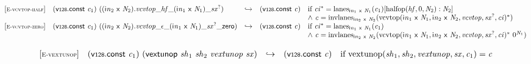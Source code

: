 $$
\begin{array}{@{}l@{}lcl@{}l@{}}
{[\textsc{\scriptsize E{-}vcvtop{-}half}]} \quad & (\mathsf{v{\scriptstyle128}}.\mathsf{const}~{\mathit{c}}_{{1}})~(({{\mathsf{i}}{{\mathit{n}}}}_{{2}}~\mathsf{x}~{\mathit{N}}_{{2}}) . {{{{{{{\mathit{vcvtop}}}{\mathsf{\_}}}{{\mathit{hf}}}}{\mathsf{\_}}}{({{\mathsf{i}}{{\mathit{n}}}}_{{1}}~\mathsf{x}~{\mathit{N}}_{{1}})}}{\mathsf{\_}}}{{{\mathit{sx}}^?}}) &\hookrightarrow& (\mathsf{v{\scriptstyle128}}.\mathsf{const}~{\mathit{c}}) &\quad
  \mbox{if}~{{\mathit{ci}}^\ast} = {{\mathrm{lanes}}}_{{{\mathsf{i}}{{\mathit{n}}}}_{{1}}~\mathsf{x}~{\mathit{N}}_{{1}}}({\mathit{c}}_{{1}})[{\mathrm{halfop}}({\mathit{hf}}, 0, {\mathit{N}}_{{2}}) : {\mathit{N}}_{{2}}] \\
 &&&&\quad {\land}~{\mathit{c}} = {{\mathrm{invlanes}}}_{{{\mathsf{i}}{{\mathit{n}}}}_{{2}}~\mathsf{x}~{\mathit{N}}_{{2}}}({{\mathrm{vcvtop}}({{\mathsf{i}}{{\mathit{n}}}}_{{1}}~\mathsf{x}~{\mathit{N}}_{{1}}, {{\mathsf{i}}{{\mathit{n}}}}_{{2}}~\mathsf{x}~{\mathit{N}}_{{2}}, {\mathit{vcvtop}}, {{\mathit{sx}}^?}, {\mathit{ci}})^\ast}) \\
{[\textsc{\scriptsize E{-}vcvtop{-}zero}]} \quad & (\mathsf{v{\scriptstyle128}}.\mathsf{const}~{\mathit{c}}_{{1}})~(({{\mathsf{i}}{{\mathit{n}}}}_{{2}}~\mathsf{x}~{\mathit{N}}_{{2}}) . {{{{{{{{{\mathit{vcvtop}}}{\mathsf{\_}}}{\epsilon}}{\mathsf{\_}}}{({{\mathsf{i}}{{\mathit{n}}}}_{{1}}~\mathsf{x}~{\mathit{N}}_{{1}})}}{\mathsf{\_}}}{{{\mathit{sx}}^?}}}{\mathsf{\_}}}{\mathsf{zero}}) &\hookrightarrow& (\mathsf{v{\scriptstyle128}}.\mathsf{const}~{\mathit{c}}) &\quad
  \mbox{if}~{{\mathit{ci}}^\ast} = {{\mathrm{lanes}}}_{{{\mathsf{i}}{{\mathit{n}}}}_{{1}}~\mathsf{x}~{\mathit{N}}_{{1}}}({\mathit{c}}_{{1}}) \\
 &&&&\quad {\land}~{\mathit{c}} = {{\mathrm{invlanes}}}_{{{\mathsf{i}}{{\mathit{n}}}}_{{2}}~\mathsf{x}~{\mathit{N}}_{{2}}}({{\mathrm{vcvtop}}({{\mathsf{i}}{{\mathit{n}}}}_{{1}}~\mathsf{x}~{\mathit{N}}_{{1}}, {{\mathsf{i}}{{\mathit{n}}}}_{{2}}~\mathsf{x}~{\mathit{N}}_{{2}}, {\mathit{vcvtop}}, {{\mathit{sx}}^?}, {\mathit{ci}})^\ast}~{0^{{\mathit{N}}_{{1}}}}) \\
\end{array}
$$

\vspace{1ex}

$$
\begin{array}{@{}l@{}lcl@{}l@{}}
{[\textsc{\scriptsize E{-}vextunop}]} \quad & (\mathsf{v{\scriptstyle128}}.\mathsf{const}~{\mathit{c}}_{{1}})~(\mathsf{vextunop}~{\mathit{sh}}_{{1}}~{\mathit{sh}}_{{2}}~{\mathit{vextunop}}~{\mathit{sx}}) &\hookrightarrow& (\mathsf{v{\scriptstyle128}}.\mathsf{const}~{\mathit{c}}) &\quad
  \mbox{if}~{\mathrm{vextunop}}({\mathit{sh}}_{{1}}, {\mathit{sh}}_{{2}}, {\mathit{vextunop}}, {\mathit{sx}}, {\mathit{c}}_{{1}}) = {\mathit{c}} \\
\end{array}
$$

